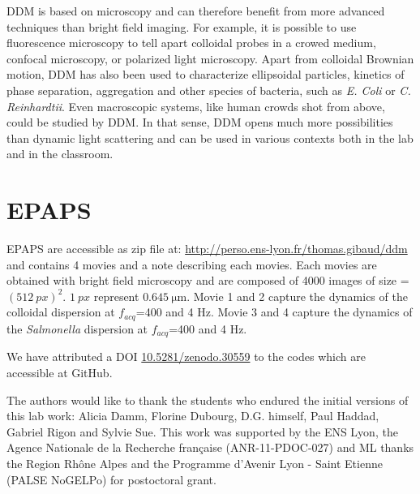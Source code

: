 \documentclass[prb,twocolumn,amsmath,amssymb]{revtex4-1}
\begin{document}
DDM is based  on microscopy and can therefore benefit from  more advanced techniques than bright field imaging. For example, it is possible to use fluorescence microscopy to tell apart colloidal probes in a crowed medium\cite{Hendricks2015}, confocal microscopy\cite{Lu2012}, or polarized light microscopy\citep{20_reufer2012differential}. Apart from colloidal Brownian motion, DDM has also been used to characterize ellipsoidal particles\citep{20_reufer2012differential}, kinetics of phase separation\cite{Gao2015}, aggregation\cite{Ferri2011} and other species of bacteria, such as \textit{E. Coli} or \textit{C. Reinhardtii}\cite{4_Martinez20121637}. Even macroscopic systems, like human crowds shot from above, could be studied by DDM. In that sense, DDM opens much more possibilities than dynamic light scattering and can be used in various contexts both in the lab and in the classroom.

\section*{EPAPS}
\label{sec:epaps}
EPAPS are accessible as zip file at: \url{http://perso.ens-lyon.fr/thomas.gibaud/ddm} and  contains 4 movies and a note describing each movies. Each movies are obtained with bright field microscopy and are composed of 4000 images of size = $(\SI{512}{px})^2$.  $\SI{1}{px}$ represent $\SI{0.645}{\micro\meter}$. Movie 1 and 2 capture the dynamics of the colloidal dispersion at $f_{acq}$=400 and 4 Hz. Movie 3 and 4 capture the dynamics of the \textit{Salmonella} dispersion at $f_{acq}$=400 and 4 Hz.

We have attributed a DOI \href{http://dx.doi.org/10.5281/zenodo.30559}{10.5281/zenodo.30559}\cite{code_github} to the codes which are accessible at GitHub.


\begin{acknowledgments}
The authors would like to thank the students who endured the initial versions of this lab work: Alicia Damm, Florine Dubourg, D.G. himself, Paul Haddad, Gabriel Rigon and Sylvie Sue. 
This work was supported by the ENS Lyon, the Agence Nationale de la Recherche fran\c{c}aise (ANR-11-PDOC-027) and ML thanks the Region Rh\^one Alpes and
the Programme d'Avenir Lyon - Saint Etienne (PALSE NoGELPo) for postoctoral grant.
\end{acknowledgments}



\end{document}
